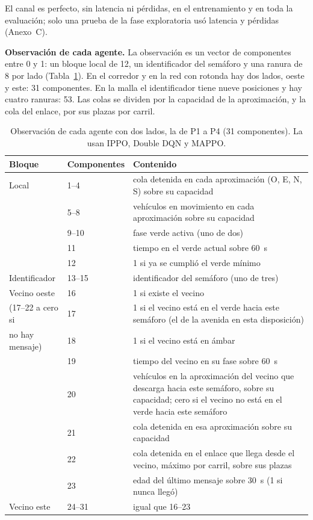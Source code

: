 El canal es perfecto, sin latencia ni pérdidas, en el entrenamiento y
en toda la evaluación; solo una prueba de la fase exploratoria usó
latencia y pérdidas (Anexo~C).

\noindent\textbf{Observación de cada agente.} La observación es un
vector de componentes entre 0 y 1: un bloque local
de 12, un identificador del semáforo y una ranura de 8 por lado
(Tabla~\ref{tab:obs-u4}). En el corredor y en la red con rotonda hay
dos lados, oeste y este: 31 componentes. En la malla el identificador
tiene nueve posiciones y hay cuatro ranuras: 53. Las colas se dividen
por la capacidad de la aproximación, y la cola del enlace, por sus
plazas por carril.

\begin{table}[H]
\centering
\scriptsize
\setlength{\tabcolsep}{3pt}
\begin{tabular}{llp{9.2cm}}
\toprule
Bloque & Componentes & Contenido \\
\midrule
Local & 1--4 & cola detenida en cada aproximación (O, E, N, S) sobre su capacidad \\
 & 5--8 & vehículos en movimiento en cada aproximación sobre su capacidad \\
 & 9--10 & fase verde activa (uno de dos) \\
 & 11 & tiempo en el verde actual sobre 60~s \\
 & 12 & 1 si ya se cumplió el verde mínimo \\
\midrule
Identificador & 13--15 & identificador del semáforo (uno de tres) \\
\midrule
Vecino oeste & 16 & 1 si existe el vecino \\
(17--22 a cero si & 17 & 1 si el vecino está en el verde hacia este semáforo (el de la avenida en esta disposición) \\
no hay mensaje) & 18 & 1 si el vecino está en ámbar \\
 & 19 & tiempo del vecino en su fase sobre 60~s \\
 & 20 & vehículos en la aproximación del vecino que descarga hacia este semáforo, sobre su capacidad; cero si el vecino no está en el verde hacia este semáforo \\
 & 21 & cola detenida en esa aproximación sobre su capacidad \\
 & 22 & cola detenida en el enlace que llega desde el vecino, máximo por carril, sobre sus plazas \\
 & 23 & edad del último mensaje sobre 30~s (1 si nunca llegó) \\
\midrule
Vecino este & 24--31 & igual que 16--23 \\
\bottomrule
\end{tabular}
\caption[Observación de cada agente]{Observación de cada agente con dos lados, la de P1 a P4 (31
componentes). La usan IPPO, Double DQN y MAPPO.}
\label{tab:obs-u4}
\end{table}

